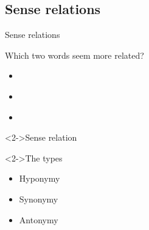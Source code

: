 \documentclass{beamer}
\newcommand{\subtwothree}{Sense relations}
\begin{document}
    \subsection{\subtwothree}
      \begin{frame}{\subtwothree}
        \begin{block}{Which two words seem more related?}
          \begin{itemize}
            \item \alert<2->{}
            \item {}
            \item \alert<2->{}
          \end{itemize}
        \end{block}
        \begin{alertblock}<2->{Sense relation}
          
        \end{alertblock}
        \begin{block}<2->{The types}
          \begin{itemize}
            \item Hyponymy
            \item Synonymy
            \item Antonymy
          \end{itemize}
        \end{block}
      \end{frame}
\end{document}

